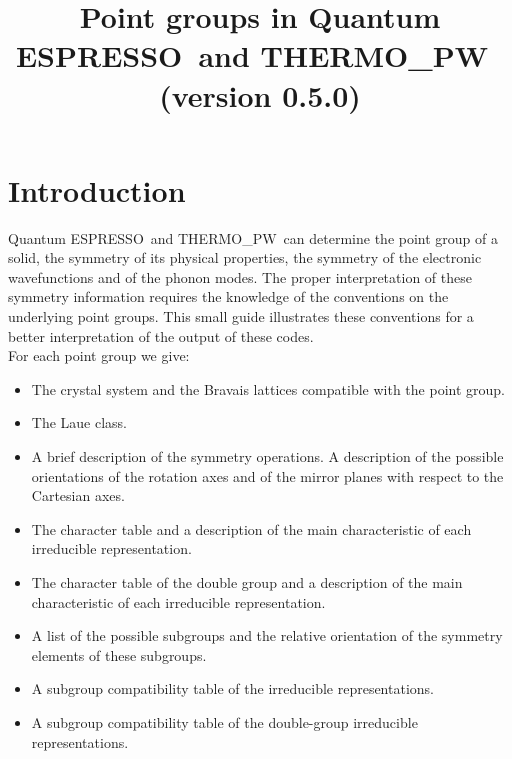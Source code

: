\documentclass[12pt,a4paper]{article}
\def\version{0.5.0}
\def\qe{{\sc Quantum ESPRESSO}}
\def\tpw{{\sc THERMO\_PW}}
\begin{document}
 
\author{}
\date{}


\title{
  \vskip 1cm
  {\color{red}\Huge Point groups in \qe\ and \tpw\ }
  \Large (version \version)
}

\maketitle

\tableofcontents

\newpage

\section{\color{coral}Introduction}
\qe\ and \tpw\ can determine the point group of a
solid, the symmetry of its physical properties, the symmetry
of the electronic wavefunctions and of the phonon modes. The proper interpretation
of these symmetry information requires the knowledge of the conventions on the 
underlying point groups. This small guide illustrates these conventions
for a better interpretation of the output of these codes. \\
For each point group we give: 
\begin{itemize}

\item
The crystal system and the Bravais lattices compatible with the point
group.

\item
The Laue class.

\item
A brief description of the symmetry operations. 
A description of the possible orientations of the rotation axes and of the 
mirror planes with respect to the Cartesian axes.

\item
The character table and a description of the main characteristic of each 
irreducible representation.

\item
The character table of the double group and a description of the main 
characteristic of each irreducible representation.

\item
A list of the possible subgroups and the relative orientation of the symmetry
elements of these subgroups.

\item
A subgroup compatibility table of the irreducible representations.

\item
A subgroup compatibility table of the double-group irreducible representations. 

\end{itemize}
\end{document}
